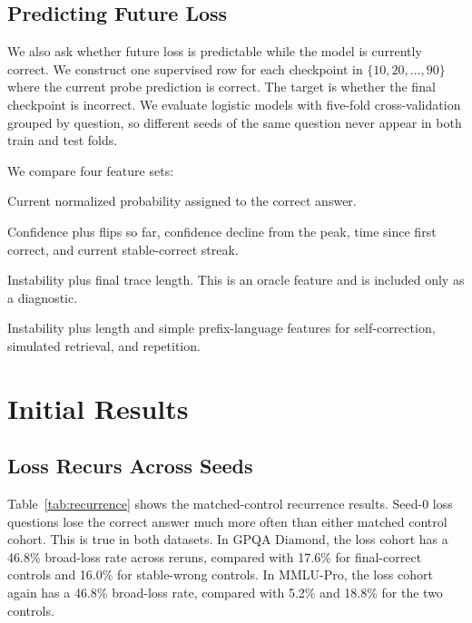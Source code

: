 \documentclass[11pt]{article}
\begin{document}
\subsection{Predicting Future Loss}

We also ask whether future loss is predictable while the model is currently
correct. We construct one supervised row for each checkpoint in
$\{10,20,\ldots,90\}$ where the current probe prediction is correct. The
target is whether the final checkpoint is incorrect. We evaluate logistic
models with five-fold cross-validation grouped by question, so different
seeds of the same question never appear in both train and test folds.

We compare four feature sets:

\begin{description}[leftmargin=*]
  \item[Confidence.] Current normalized probability assigned to the correct
  answer.
  \item[Instability.] Confidence plus flips so far, confidence decline from
  the peak, time since first correct, and current stable-correct streak.
  \item[Instability + length.] Instability plus final trace length. This is
  an oracle feature and is included only as a diagnostic.
  \item[Full prefix.] Instability plus length and simple prefix-language
  features for self-correction, simulated retrieval, and repetition.
\end{description}

\section{Initial Results}

\subsection{Loss Recurs Across Seeds}

Table~\ref{tab:recurrence} shows the matched-control recurrence results.
Seed-0 loss questions lose the correct answer much more often than either
matched control cohort. This is true in both datasets. In GPQA Diamond, the
loss cohort has a 46.8\% broad-loss rate across reruns, compared with 17.6\%
for final-correct controls and 16.0\% for stable-wrong controls. In MMLU-Pro,
the loss cohort again has a 46.8\% broad-loss rate, compared with 5.2\% and
18.8\% for the two controls.
\end{document}
